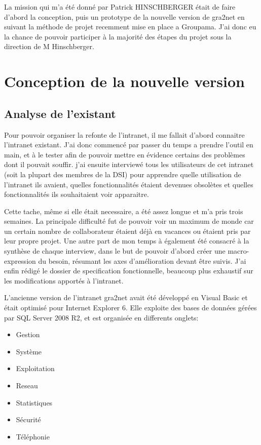 La mission qui m'a été donné par Patrick HINSCHBERGER était de faire
d'abord la conception, puis un prototype de la nouvelle version de
gra2net en suivant la méthode de projet recemment mise en place a
Groupama. J'ai donc eu la chance de pouvoir participer à la majorité 
des étapes du projet sous la direction de M Hinschberger. 

\chapter{Conception de la nouvelle version}

\section{Analyse de l'existant}

Pour pouvoir organiser la refonte de l'intranet, il me fallait d'abord
connaitre l'intranet existant. J'ai donc commencé par passer du temps
a prendre l'outil en main, et à le tester afin de pouvoir mettre en
évidence certains des problèmes dont il pouvait souffir.  j'ai ensuite
interviewé tous les utilisateurs de cet intranet (soit la plupart des
membres de la DSI) pour apprendre quelle utilisation de l'intranet ils
avaient, quelles fonctionnalités étaient devenues obsolètes
et quelles fonctionnalités ils souhaitaient voir apparaitre.

Cette tache, même si elle était necessaire, a été assez longue et m'a
pris trois semaines. La principale difficulté fut de pouvoir voir un
maximum de monde car un certain nombre de collaborateur étaient déjà
en vacances ou étaient pris par leur propre projet. Une autre part de
mon temps à également été consacré à la synthèse de chaque interview,
dans le but de pouvoir d'abord créer une macro-expression du besoin,
résumant les axes d'amélioration devant être suivis. J'ai enfin rédigé
le dossier de specification fonctionnelle, beaucoup plus exhaustif sur
les modifications apportés à l'intranet.

L'ancienne version de l'intranet gra2net avait été développé en Visual
Basic et était optimisé pour Internet Explorer 6. Elle exploite des
bases de données gérées par SQL Server 2008 R2, et est organisée en
differents onglets:
\begin{itemize}
\item Gestion
\item Système
\item Exploitation
\item Reseau
\item Statistiques
\item Sécurité
\item Téléphonie\\
\end{itemize}

